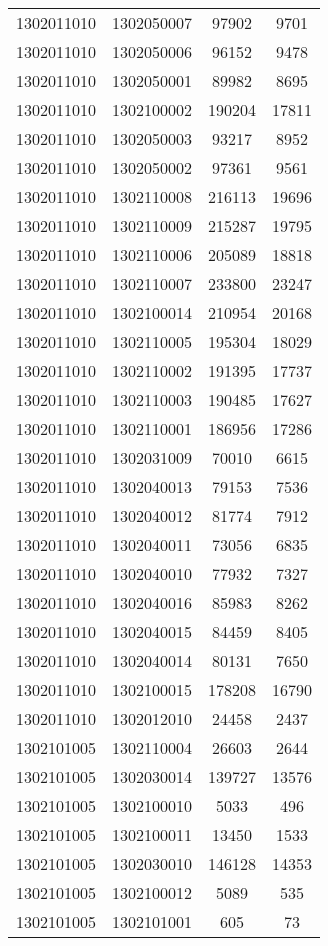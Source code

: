 \begin{longtable}{llcc}
1302011010 & 1302050007 & 97902 & 9701\\
1302011010 & 1302050006 & 96152 & 9478\\
1302011010 & 1302050001 & 89982 & 8695\\
1302011010 & 1302100002 & 190204 & 17811\\
1302011010 & 1302050003 & 93217 & 8952\\
1302011010 & 1302050002 & 97361 & 9561\\
1302011010 & 1302110008 & 216113 & 19696\\
1302011010 & 1302110009 & 215287 & 19795\\
1302011010 & 1302110006 & 205089 & 18818\\
1302011010 & 1302110007 & 233800 & 23247\\
1302011010 & 1302100014 & 210954 & 20168\\
1302011010 & 1302110005 & 195304 & 18029\\
1302011010 & 1302110002 & 191395 & 17737\\
1302011010 & 1302110003 & 190485 & 17627\\
1302011010 & 1302110001 & 186956 & 17286\\
1302011010 & 1302031009 & 70010 & 6615\\
1302011010 & 1302040013 & 79153 & 7536\\
1302011010 & 1302040012 & 81774 & 7912\\
1302011010 & 1302040011 & 73056 & 6835\\
1302011010 & 1302040010 & 77932 & 7327\\
1302011010 & 1302040016 & 85983 & 8262\\
1302011010 & 1302040015 & 84459 & 8405\\
1302011010 & 1302040014 & 80131 & 7650\\
1302011010 & 1302100015 & 178208 & 16790\\
1302011010 & 1302012010 & 24458 & 2437\\
1302101005 & 1302110004 & 26603 & 2644\\
1302101005 & 1302030014 & 139727 & 13576\\
1302101005 & 1302100010 & 5033 & 496\\
1302101005 & 1302100011 & 13450 & 1533\\
1302101005 & 1302030010 & 146128 & 14353\\
1302101005 & 1302100012 & 5089 & 535\\
1302101005 & 1302101001 & 605 & 73\\

\end{longtable}
